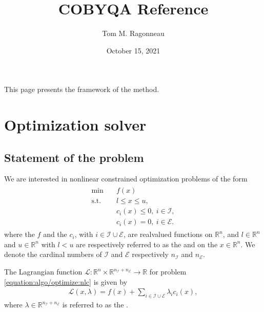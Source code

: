 \documentclass[letterpaper,10pt,english]{sphinxmanual}
\title{COBYQA Reference}
\date{October 15, 2021}
\author{Tom M. Ragonneau}
\def\R{\ensuremath{\mathds{R}}}
\newcommand{\dv}{x}
\newcommand{\icon}{i}
\newcommand{\lmv}{\lambda}
\newcommand{\nv}{n}
\newcommand{\bl}{l}
\newcommand{\bu}{u}
\newcommand{\con}[1][\icon]{c_{#1}}
\newcommand{\lag}{\mathcal{L}}
\newcommand{\meq}{n_{\scriptscriptstyle\seq}}
\newcommand{\mub}{n_{\scriptscriptstyle\sub}}
\newcommand{\obj}{f}
\newcommand{\seq}{\mathcal{E}}
\newcommand{\sub}{\mathcal{I}}
\begin{document}
\pagestyle{empty}
\sphinxmaketitle
\pagestyle{plain}
\sphinxtableofcontents
\pagestyle{normal}
\label{\detokenize{algo/index::doc}}


\sphinxAtStartPar
This page presents the framework of the method.


\chapter{Optimization solver}
\label{\detokenize{algo/optimize:optimization-solver}}\label{\detokenize{algo/optimize:optimize}}\label{\detokenize{algo/optimize::doc}}

\section{Statement of the problem}
\label{\detokenize{algo/optimize:statement-of-the-problem}}
\sphinxAtStartPar
We are interested in nonlinear constrained optimization problems of the form
\begin{equation}\label{equation:algo/optimize:nlc}
\begin{split}\begin{array}{ll}
    \min        & \quad \obj(\dv)\\
    \text{s.t.} & \quad \bl \le \dv \le \bu,\\
                & \quad \con(\dv) \le 0, ~ \icon \in \sub,\\
                & \quad \con(\dv) = 0, ~ \icon \in \seq.
\end{array}\end{split}
\end{equation}
\sphinxAtStartPar
where the  \(\obj\) and the 
\(\con\), with \(\icon \in \sub \cup \seq\), are real\sphinxhyphen{}valued functions
on \(\R^{\nv}\), and \(\bl \in \R^{\nv}\) and \(\bu \in \R^{\nv}\)
with \(\bl < \bu\) are respectively referred to as the  and
 on the  \(\dv \in \R^{\nv}\).
We denote the cardinal numbers of \(\sub\) and \(\seq\) respectively
\(\mub\) and \(\meq\).

\sphinxAtStartPar
The Lagrangian function \(\lag \colon \R^n \times \R^{\mub + \meq} \to \R\)
for problem \eqref{equation:algo/optimize:nlc} is given by
\begin{equation}\label{equation:algo/optimize:lag}
\begin{split}\lag(\dv, \lmv) = \obj(\dv) + \sum_{\icon \in \sub \cup \seq} \lmv_{\icon}
\con(\dv),\end{split}
\end{equation}
\sphinxAtStartPar
where \(\lmv \in \R^{\mub + \meq}\) is referred to as the .
\end{document}
